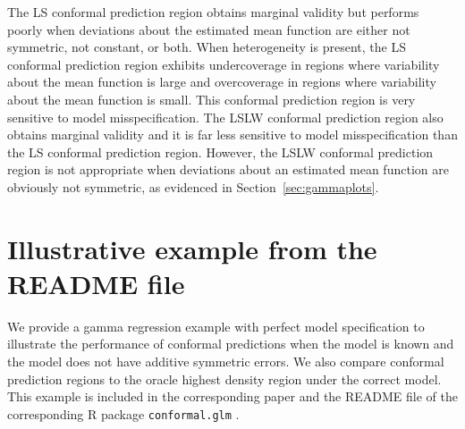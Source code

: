 \documentclass[11pt]{article}\usepackage[]{graphicx}\usepackage[]{color}
\begin{document}
The LS conformal prediction region obtains marginal validity 
\citep{lei2018distribution} but performs poorly when deviations about the 
estimated mean function are either not symmetric, not constant, or both.
When heterogeneity is present, the LS conformal prediction region exhibits 
undercoverage in regions where variability about the mean function is large 
and overcoverage in regions where variability about the mean function is 
small.  This conformal prediction region is very sensitive to model 
misspecification.  
The LSLW conformal prediction region also obtains marginal validity 
\citep[Section 5.2]{lei2018distribution} and it is far less sensitive to 
model misspecification than the LS conformal prediction region.  
However, the LSLW conformal prediction region is not appropriate 
when deviations about an estimated mean function are obviously not 
symmetric, as evidenced in Section~\ref{sec:gammaplots}.



\section{Illustrative example from the README file}
\label{sec:README}

We provide a gamma regression example with perfect model specification to 
illustrate the performance of conformal predictions when the model is known 
and the model does not have additive symmetric errors.  We also compare 
conformal prediction regions to the oracle highest density region under 
the correct model. This example is included in the corresponding paper  
\citet{eck2019conformal} and the README file of the corresponding 
R package \texttt{conformal.glm} \citep{eck2018conformalR}.
\end{document}

